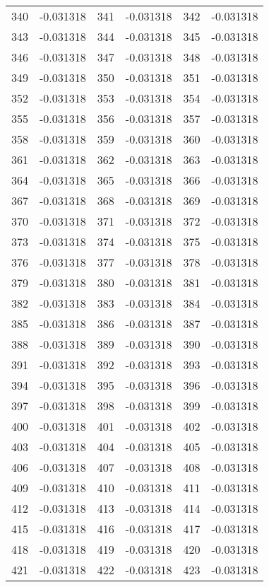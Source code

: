 \documentclass[12pt]{article}
\begin{document}
\begin{longtable}{@{}cc|cc|cc@{}}
340 & -0.031318 & 341 & -0.031318 & 342 & -0.031318 \\
343 & -0.031318 & 344 & -0.031318 & 345 & -0.031318 \\
346 & -0.031318 & 347 & -0.031318 & 348 & -0.031318 \\
349 & -0.031318 & 350 & -0.031318 & 351 & -0.031318 \\
352 & -0.031318 & 353 & -0.031318 & 354 & -0.031318 \\
355 & -0.031318 & 356 & -0.031318 & 357 & -0.031318 \\
358 & -0.031318 & 359 & -0.031318 & 360 & -0.031318 \\
361 & -0.031318 & 362 & -0.031318 & 363 & -0.031318 \\
364 & -0.031318 & 365 & -0.031318 & 366 & -0.031318 \\
367 & -0.031318 & 368 & -0.031318 & 369 & -0.031318 \\
370 & -0.031318 & 371 & -0.031318 & 372 & -0.031318 \\
373 & -0.031318 & 374 & -0.031318 & 375 & -0.031318 \\
376 & -0.031318 & 377 & -0.031318 & 378 & -0.031318 \\
379 & -0.031318 & 380 & -0.031318 & 381 & -0.031318 \\
382 & -0.031318 & 383 & -0.031318 & 384 & -0.031318 \\
385 & -0.031318 & 386 & -0.031318 & 387 & -0.031318 \\
388 & -0.031318 & 389 & -0.031318 & 390 & -0.031318 \\
391 & -0.031318 & 392 & -0.031318 & 393 & -0.031318 \\
394 & -0.031318 & 395 & -0.031318 & 396 & -0.031318 \\
397 & -0.031318 & 398 & -0.031318 & 399 & -0.031318 \\
400 & -0.031318 & 401 & -0.031318 & 402 & -0.031318 \\
403 & -0.031318 & 404 & -0.031318 & 405 & -0.031318 \\
406 & -0.031318 & 407 & -0.031318 & 408 & -0.031318 \\
409 & -0.031318 & 410 & -0.031318 & 411 & -0.031318 \\
412 & -0.031318 & 413 & -0.031318 & 414 & -0.031318 \\
415 & -0.031318 & 416 & -0.031318 & 417 & -0.031318 \\
418 & -0.031318 & 419 & -0.031318 & 420 & -0.031318 \\
421 & -0.031318 & 422 & -0.031318 & 423 & -0.031318 \\

\end{longtable}
\end{document}
